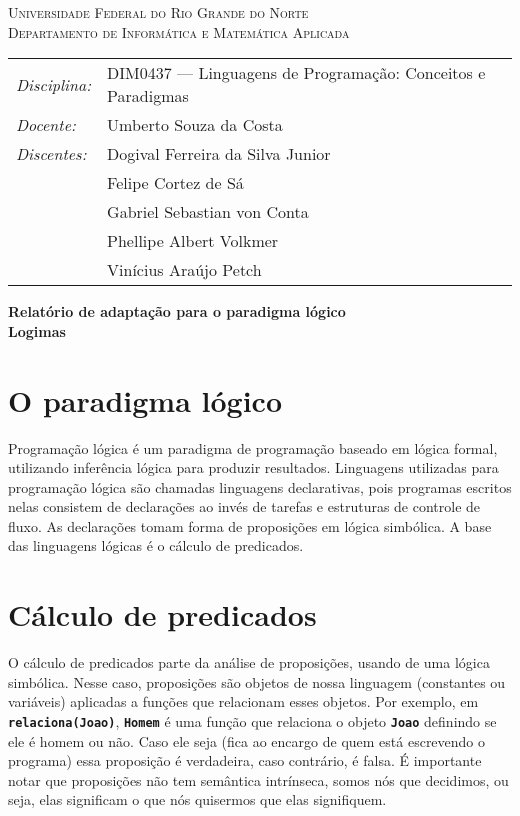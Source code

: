 \documentclass[12pt, a4paper]{article}
\newcommand{\inlinecode}[1]{\textbf{\lstinline{#1}}}
\begin{document}
\begin{center}
    \textsc{Universidade Federal do Rio Grande do Norte} \\
    \textsc{Departamento de Informática e Matemática Aplicada}
\end{center}

\bigskip

\begin{tabular}{@{}ll@{}}
    \emph{Disciplina:} & DIM0437 --- Linguagens de Programação:
                            Conceitos e Paradigmas \\
    \emph{Docente:}    & Umberto Souza da Costa \\
    \emph{Discentes:}  & Dogival Ferreira da Silva Junior \\
                       & Felipe Cortez de Sá \\
                       & Gabriel Sebastian von Conta \\
                       & Phellipe Albert Volkmer \\
                       & Vinícius Araújo Petch
\end{tabular}

\bigskip

\begin{center}
\large \textbf{Relatório de adaptação para o paradigma lógico \\ Logimas}
\end{center}

\bigskip

\section{O paradigma lógico}
Programação lógica é um paradigma de programação baseado em lógica
formal, utilizando inferência lógica para produzir resultados.
Linguagens utilizadas para programação lógica são chamadas linguagens
declarativas, pois programas escritos nelas consistem de declarações ao
invés de tarefas e estruturas de controle de fluxo. As declarações
tomam forma de proposições em lógica simbólica. A base das linguagens
lógicas é o cálculo de predicados.

\section{Cálculo de predicados}
O cálculo de predicados parte da análise de proposições, usando de uma
lógica simbólica. Nesse caso, proposições são objetos de nossa
linguagem (constantes ou variáveis) aplicadas a funções que relacionam
esses objetos. Por exemplo, em \inlinecode{relaciona(Joao)},
\inlinecode{Homem} é uma função que relaciona o objeto
\inlinecode{Joao} definindo se ele é homem ou não. Caso ele seja
(fica ao encargo de quem está escrevendo o programa) essa proposição é
verdadeira, caso contrário, é falsa. É importante notar que proposições
não tem semântica intrínseca, somos nós que decidimos, ou seja, elas
significam o que nós quisermos que elas signifiquem.
\end{document}
